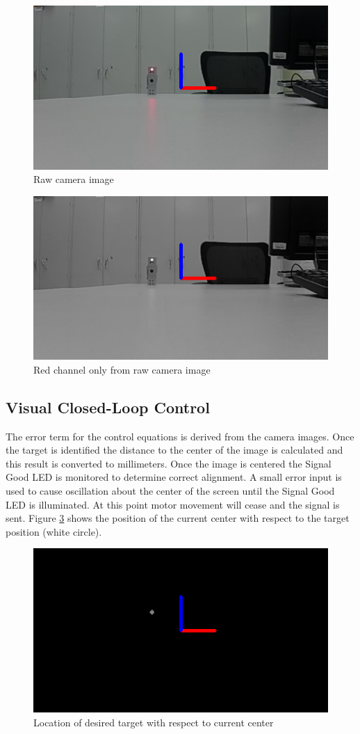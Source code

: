 \documentclass[botnum, fleqn]{unmeethesis}
\begin{document}
\begin{figure}[ht]
 \begin{center}
  \includegraphics[width=0.5 \textwidth]{figures/frame.png}
  \caption{\small \label{fig:frame} Raw camera image}
 \end{center}
\end{figure}

\begin{figure}[ht]
 \begin{center}
  \includegraphics[width=0.5 \textwidth]{figures/bw.png}
  \caption{\small \label{fig:bw} Red channel only from raw camera image}
 \end{center}
\end{figure}

\subsection*{Visual Closed-Loop Control}

The error term for the control equations is derived from the camera images. Once the target is identified the distance to the center of the image is calculated and this result is converted to millimeters. Once the image is centered the Signal Good LED is monitored to determine correct alignment. A small error input is used to cause oscillation about the center of the screen until the Signal Good LED is illuminated. At this point motor movement will cease and the signal is sent. Figure \ref{fig:dot} shows the position of the current center with respect to the target position (white circle).

\begin{figure}[ht]
 \begin{center}
  \includegraphics[width=0.5 \textwidth]{figures/dot.png}
  \caption{\small \label{fig:dot} Location of desired target with respect to current center}
 \end{center}
\end{figure}
\end{document}
